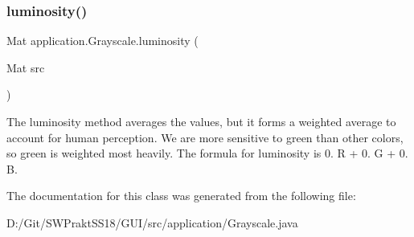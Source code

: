 \subsubsection{\texorpdfstring{luminosity()}{luminosity()}}
{\footnotesize\ttfamily Mat application.\+Grayscale.\+luminosity (\begin{DoxyParamCaption}\item[{Mat}]{src }\end{DoxyParamCaption})}

The luminosity method averages the values, but it forms a weighted average to account for human perception. We are more sensitive to green than other colors, so green is weighted most heavily. The formula for luminosity is 0. R + 0. G + 0. B. 

The documentation for this class was generated from the following file\+:\begin{DoxyCompactItemize}
\item 
D\+:/\+Git/\+S\+W\+Prakt\+S\+S18/\+G\+U\+I/src/application/Grayscale.\+java\end{DoxyCompactItemize}
